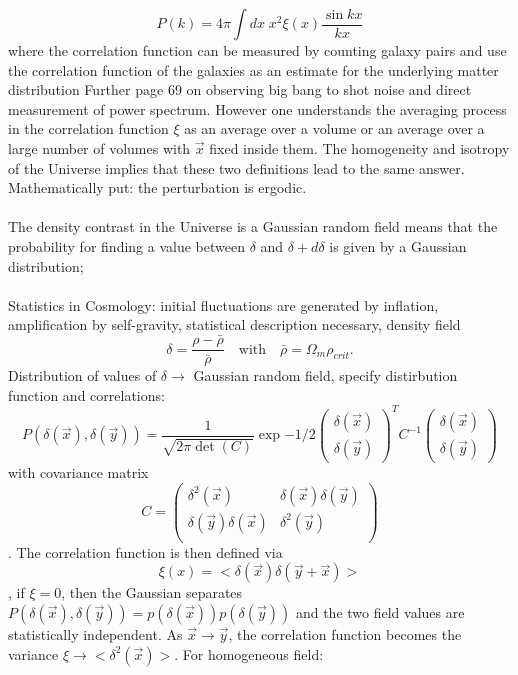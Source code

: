 \begin{description}
	\[P(k) = 4 \pi \int dx \; x^2 \xi(x) \frac{\sin{kx}}{kx}\]
	where the correlation function can be measured by counting galaxy pairs and use the correlation function of the galaxies as an estimate for the underlying matter distribution Further page 69 on observing big bang to shot noise and direct measurement of power spectrum.  However one understands the averaging process in the correlation function $\xi$ as an average over a volume or an average over a large number of volumes with $\vec{x}$ fixed inside them. The homogeneity and isotropy of the Universe implies that these two definitions lead
	to the same answer. Mathematically put: the perturbation is ergodic.\\
	\\
	The density contrast in the Universe
	is a Gaussian random field means that the probability for finding a
	value between $\delta$ and $\delta + d\delta$ is given by a Gaussian distribution;\\
	\\
	Statistics in Cosmology: initial fluctuations are generated by inflation, amplification by self-gravity, statistical description necessary, density field
	\begin{equation}
	\delta = \frac{\rho -\bar{\rho}}{\bar{\rho}} \quad \mathrm{with} \quad \bar{\rho} = \Omega_m \rho_{crit}.
	\end{equation}
	Distribution of values of $\delta \rightarrow$ Gaussian random field, specify distirbution function and correlations:
	\[	P(\delta(\vec{x}), \delta(\vec{y})) = \frac{1}{\sqrt{2 \pi \det(C)}} \exp{-1/2 
		\begin{pmatrix}
		\delta(\vec{x})\\
		\delta(\vec{y})
		\end{pmatrix}^T			
		C^{-1}
		\begin{pmatrix}
		\delta(\vec{x})\\
		\delta(\vec{y})
		\end{pmatrix}}
	\]
	with covariance matrix
	\[ C =  \begin{pmatrix}
	\delta^2(\vec{x}) & \delta(\vec{x}) \delta(\vec{y})\\
	\delta(\vec{y}) \delta(\vec{x}) & \delta^2(\vec{y})\\
	\end{pmatrix}\].
	The correlation function is then defined via
	\[\xi({x}) = <  \delta(\vec{x})\delta(\vec{y}+\vec{x})>\],
	if $\xi = 0$, then the Gaussian separates $P(\delta(\vec{x}),\delta(\vec{y}))= p(\delta(\vec{x})) p(\delta(\vec{y}))$ and the two field values are statistically independent. As $\vec{x}\rightarrow\vec{y}$, the correlation function becomes the variance $\xi\rightarrow <\delta^2(\vec{x})>$. For  homogeneous field:

\end{description}
